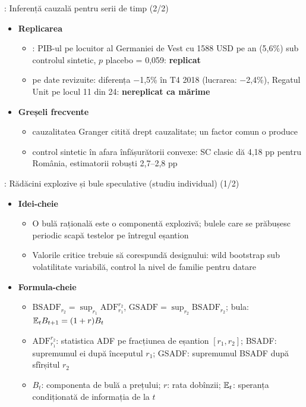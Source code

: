 \begin{frame}{: Inferență cauzală pentru serii de timp (2/2)}
\itemsize{\small}
\begin{itemize}
    \item \textbf{Replicarea}
    \begin{itemize}
        \item {}: PIB-ul pe locuitor al Germaniei de Vest cu 1588 USD pe an (5{,}6\%) sub controlul sintetic, $p$ placebo = 0{,}059: \textbf{replicat}
        \item {} pe date revizuite: diferența $-$1{,}5\% în T4 2018 (lucrarea: $-$2{,}4\%), Regatul Unit pe locul 11 din 24: \textbf{nereplicat ca mărime}
    \end{itemize}
    \item \textbf{Greșeli frecvente}
    \begin{itemize}
        \item cauzalitatea Granger citită drept cauzalitate; un factor comun o produce
        \item control sintetic în afara înfășurătorii convexe: SC clasic dă 4{,}18 pp pentru România, estimatorii robuști 2{,}7--2{,}8 pp
    \end{itemize}
\end{itemize}
\end{frame}

\begin{frame}{: Rădăcini explozive și bule speculative (studiu individual) (1/2)}
\itemsize{\footnotesize}
\begin{itemize}
    \item \textbf{Idei-cheie}
    \begin{itemize}
        \item O bulă rațională este o componentă explozivă; bulele care se prăbușesc periodic scapă testelor pe întregul eșantion
        \item Valorile critice trebuie să corespundă designului: wild bootstrap sub volatilitate variabilă, control la nivel de familie pentru datare
    \end{itemize}
    \item \textbf{Formula-cheie}
    \begin{itemize}
        \item $\mathrm{BSADF}_{r_2} = \sup_{r_1}\mathrm{ADF}_{r_1}^{r_2}$, $\mathrm{GSADF} = \sup_{r_2}\mathrm{BSADF}_{r_2}$; bula: $\mathbb{E}_tB_{t+1} = (1 + r)B_t$
        \item $\mathrm{ADF}_{r_1}^{r_2}$: statistica ADF pe fracțiunea de eșantion $[r_1, r_2]$; BSADF: supremumul ei după începutul $r_1$; GSADF: supremumul BSADF după sfîrșitul $r_2$
        \item $B_t$: componenta de bulă a prețului; $r$: rata dobînzii; $\mathbb{E}_t$: speranța condiționată de informația de la $t$
    \end{itemize}
\end{itemize}
\end{frame}

